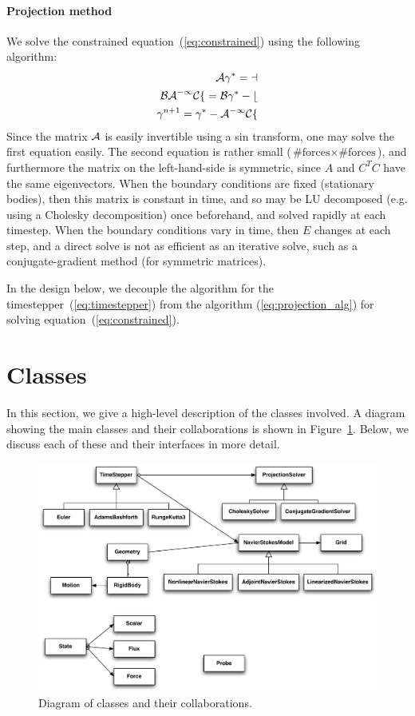 \documentclass[11pt]{article}
\begin{document}
\paragraph{Projection method}
We solve the constrained equation~(\ref{eq:constrained}) using the following algorithm:
\begin{equation}
\begin{aligned}
	\cal{A}\gamma^* = a\\
	\cal{BA}^{-1}\cal{C}f = \cal{B}\gamma^* - b\\
	\gamma^{n+1} = \gamma^* - \cal{A}^{-1}\cal{C}f
\end{aligned}
\label{eq:projection_alg}
\end{equation}
Since the matrix $\cal{A}$ is easily invertible using a sin transform, one may solve the first equation easily.  The second equation is rather small ($\text{\#forces} \times \text{\#forces}$), and furthermore the matrix on the left-hand-side is symmetric, since $A$ and $C^TC$ have the same eigenvectors.  When the boundary conditions are fixed (stationary bodies), then this matrix is constant in time, and so may be LU decomposed (e.g. using a Cholesky decomposition) once beforehand, and solved rapidly at each timestep.  When the boundary conditions vary in time, then $E$ changes at each step, and a direct solve is not as efficient as an iterative solve, such as a conjugate-gradient method (for symmetric matrices).

In the design below, we decouple the algorithm for the timestepper~(\ref{eq:timestepper}) from the algorithm (\ref{eq:projection_alg}) for solving equation~(\ref{eq:constrained}).

\section{Classes}
In this section, we give a high-level description of the classes involved.  A diagram showing the main classes and their collaborations is shown in Figure~\ref{fig:class_diagram}.  Below, we discuss each of these and their interfaces in more detail.

\begin{figure}
\centering
\includegraphics[width=0.95\linewidth]{IBFSDesign}
\caption{Diagram of classes and their collaborations.}
\label{fig:class_diagram}
\end{figure}
\end{document}
